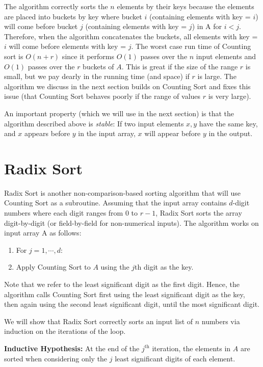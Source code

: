 \documentclass [12pt]{article}
\begin{document}
The algorithm correctly sorts the $n$ elements by their keys because the elements are placed into buckets by key where bucket $i$ (containing elements with key = $i$) will come before bucket $j$ (containing elements with key = $j$) in A for $i < j$. Therefore, when the algorithm concatenates the buckets, all elements with key = $i$ will come before elements with key = $j$. The worst case run time of Counting sort is $O(n+r)$ since it performs $O(1)$ passes over the $n$ input elements and $O(1)$ passes over the $r$ buckets of $A$. This is great if the size of the range $r$ is small, but we pay dearly in the running time (and space) if $r$ is large. The algorithm we discuss in the next section builds on Counting Sort and fixes this issue (that Counting Sort
behaves poorly if the range of values $r$ is very large).

An important property (which we will use in the next section) is that the algorithm described above is \textit{stable}: If two input elements $x, y$ have the same key, and $x$ appears before $y$ in the input array, $x$ will appear before $y$ in the output.

\section{Radix Sort}
Radix Sort is another non-comparison-based sorting algorithm that will use Counting Sort as a subroutine. Assuming that the input array contains $d$-digit numbers where each digit ranges from $0$ to $r - 1$, Radix Sort sorts the array digit-by-digit (or field-by-field for non-numerical
inputs). The algorithm works on input array A as follows:

\begin{enumerate}
  \item For $j = 1, \cdots, d$:
  \item Apply Counting Sort to $A$ using the $j$th digit as the key.
\end{enumerate}

Note that we refer to the least significant digit as the first digit. Hence, the algorithm calls Counting Sort first using the least significant digit as the key, then again using the second least significant digit, until the most significant digit. 

We will show that Radix Sort correctly sorts an input list of $n$ numbers via induction on the iterations of the loop.

\textbf{Inductive Hypothesis:} At the end of the $j^{\text{th}}$ iteration, the elements in $A$ are sorted when considering only the $j$ least significant digits of each element.
\end{document}
